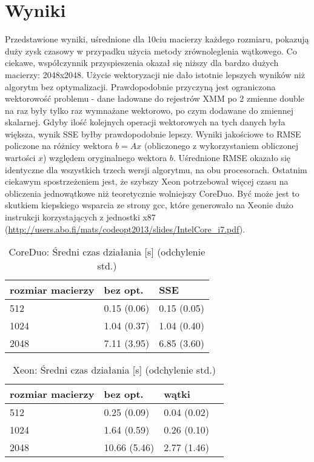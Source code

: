 \documentclass[11pt,a4paper]{article}
\begin{document}
\section{Wyniki}
Przedstawione wyniki, uśrednione dla 10ciu macierzy każdego rozmiaru, pokazują duży zysk czasowy w przypadku użycia metody zrównoleglenia wątkowego. Co ciekawe, współczynnik przyspieszenia okazał się niższy dla bardzo dużych macierzy: 2048x2048. Użycie wektoryzacji nie dało istotnie lepszych wyników niż algorytm bez optymalizacji. Prawdopodobnie przyczyną jest ograniczona wektorowość problemu - dane ładowane do rejestrów XMM po 2 zmienne double na raz były tylko raz wymnażane wektorowo, po czym dodawane do zmiennej skalarnej. Gdyby ilość kolejnych operacji wektorowych na tych danych była większa, wynik SSE byłby prawdopodobnie lepszy. Wyniki jakościowe to RMSE policzone na różnicy wektora $b = Ax$ (obliczonego z wykorzystaniem obliczonej wartości $x$) względem oryginalnego wektora $b$. Uśrednione RMSE okazało się identyczne dla wszystkich trzech wersji algorytmu, na obu procesorach. Ostatnim ciekawym spostrzeżeniem jest, że szybszy Xeon potrzebował więcej czasu na obliczenia jednowątkowe niż teoretycznie wolniejszy CoreDuo. Być może jest to skutkiem kiepskiego wsparcia ze strony gcc, które generowało na Xeonie dużo instrukcji korzystających z jednostki x87 (\url{http://users.abo.fi/mats/codeopt2013/slides/IntelCore_i7.pdf}).

\begin{table}[h!]
\begin{center}
\begin{tabular}{lll}
\toprule
rozmiar macierzy & bez opt. &  SSE \\
\midrule
512 & 0.15 (0.06) & 0.15 (0.05) \\
1024 & 1.04 (0.37) & 1.04 (0.40) \\
2048 & 7.11 (3.95) & 6.85 (3.60) \\
\bottomrule
\end{tabular}
\caption{CoreDuo: Średni czas działania [s] (odchylenie std.)}
\end{center}
\end{table}

\begin{table}[h!]
\begin{center}
\begin{tabular}{llll}
\toprule
rozmiar macierzy & bez opt. &  wątki \\
\midrule
512 & 0.25 (0.09) & 0.04 (0.02) \\
1024 & 1.64 (0.59) & 0.26 (0.10) \\
2048 & 10.66 (5.46) & 2.77 (1.46) \\
\bottomrule
\end{tabular}
\caption{Xeon: Średni czas działania [s] (odchylenie std.)}
\end{center}
\end{table}
\end{document}
